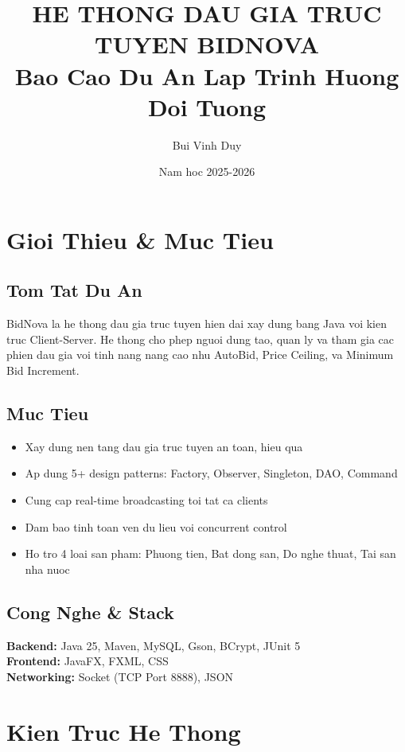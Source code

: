 ﻿\documentclass[12pt, a4paper]{report}
\title{\textbf{HE THONG DAU GIA TRUC TUYEN BIDNOVA}\\Bao Cao Du An Lap Trinh Huong Doi Tuong}
\author{Bui Vinh Duy}
\date{Nam hoc 2025-2026}
\begin{document}
\maketitle
\newpage
\tableofcontents
\newpage

\chapter{Gioi Thieu \& Muc Tieu}

\section{Tom Tat Du An}
BidNova la he thong dau gia truc tuyen hien dai xay dung bang Java voi kien truc Client-Server. He thong cho phep nguoi dung tao, quan ly va tham gia cac phien dau gia voi tinh nang nang cao nhu AutoBid, Price Ceiling, va Minimum Bid Increment.

\section{Muc Tieu}
\begin{itemize}
    \item Xay dung nen tang dau gia truc tuyen an toan, hieu qua
    \item Ap dung 5+ design patterns: Factory, Observer, Singleton, DAO, Command
    \item Cung cap real-time broadcasting toi tat ca clients
    \item Dam bao tinh toan ven du lieu voi concurrent control
    \item Ho tro 4 loai san pham: Phuong tien, Bat dong san, Do nghe thuat, Tai san nha nuoc
\end{itemize}

\section{Cong Nghe \& Stack}
\textbf{Backend:} Java 25, Maven, MySQL, Gson, BCrypt, JUnit 5 \\
\textbf{Frontend:} JavaFX, FXML, CSS \\
\textbf{Networking:} Socket (TCP Port 8888), JSON

\newpage

\chapter{Kien Truc He Thong}
\end{document}
